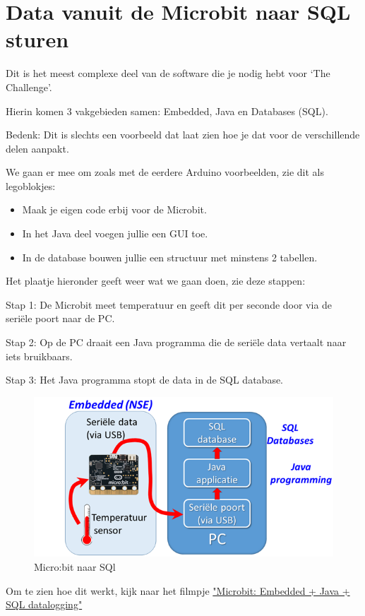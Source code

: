 \chapter{Data vanuit de Microbit naar SQL sturen}

Dit is het meest complexe deel van de software die je nodig hebt voor ‘The Challenge’. 

Hierin komen 3 vakgebieden samen: Embedded, Java en Databases (SQL).

Bedenk: Dit is slechts een voorbeeld dat laat zien hoe je dat voor de verschillende delen aanpakt.

We gaan er mee om zoals met de eerdere Arduino voorbeelden, zie dit als legoblokjes:

\begin{itemize}
	\item Maak je eigen code erbij voor de Microbit. 
\item In het Java deel voegen jullie een GUI toe.
\item In de database bouwen jullie een structuur met minstens 2 tabellen.
\end{itemize}

Het plaatje hieronder geeft weer wat we gaan doen, zie deze stappen: 

Stap 1: De Microbit meet temperatuur en geeft dit per seconde door via de seriële poort naar de PC. 

Stap 2: Op de PC draait een Java programma die de seriële data vertaalt naar iets bruikbaars.

Stap 3: Het Java programma stopt de data in de SQL database.


\begin{figure}[h!]
	\captionsetup{justification=centering}
	\includegraphics[width=0.6 \linewidth]{figuren/microToSQL}
	\centering
	\caption{Micro:bit naar SQl}
	\label{fig:microSQL}
\end{figure}

Om te zien hoe dit werkt, kijk naar het filmpje \href{https://youtu.be/wZ_bIQh9tME}{"Microbit: Embedded + Java + SQL datalogging"}


